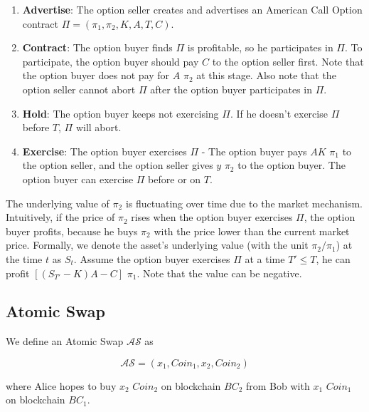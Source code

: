 \begin{enumerate}
    \item \textbf{Advertise}: The option seller creates and advertises an American Call Option contract $\Pi = (\pi_1, \pi_2, K, A, T, C)$.
    \item \textbf{Contract}: The option buyer finds $\Pi$ is profitable, so he participates in $\Pi$.
    To participate, the option buyer should pay $C$ to the option seller first.
    Note that the option buyer does not pay for $A$ $\pi_2$ at this stage.
    Also note that the option seller cannot abort $\Pi$ after the option buyer participates in $\Pi$.
    \item \textbf{Hold}: The option buyer keeps not exercising $\Pi$. If he doesn't exercise $\Pi$ before $T$, $\Pi$ will abort.
    \item \textbf{Exercise}: The option buyer exercises $\Pi$ - The option buyer pays $AK$ $\pi_1$ to the option seller, and the option seller gives $y$  $\pi_2$ to the option buyer. The option buyer can exercise $\Pi$ before or on $T$.
\end{enumerate}

The underlying value of $\pi_2$ is fluctuating over time due to the market mechanism.
Intuitively, if the price of $\pi_2$ rises when the option buyer exercises $\Pi$, the option buyer profits, because he buys $\pi_2$ with the price lower than the current market price.
Formally, we denote the asset's underlying value (with the unit $\pi_2 / \pi_1$) at the time $t$ as $S_t$.
Assume the option buyer exercises $\Pi$ at a time $T' \leq T$, he can profit $[(S_{T'} - K) A - C]$ $\pi_1$.
Note that the value can be negative.










\subsection{Atomic Swap}

\begin{definition}
We define an Atomic Swap $\mathcal{AS}$ as

$$\mathcal{AS} = (x_1, Coin_1, x_2, Coin_2)$$

where Alice hopes to buy $x_2$ $Coin_2$ on blockchain $BC_2$ from Bob with $x_1$ $Coin_1$ on blockchain $BC_1$.
\end{definition}

